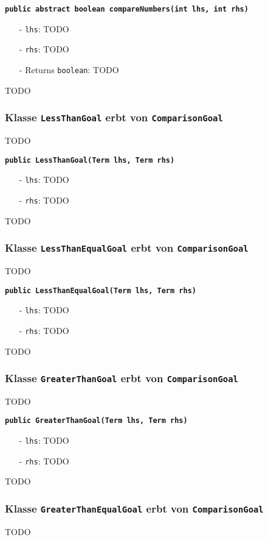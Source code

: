 \documentclass[parskip=full,11pt,twoside]{scrartcl}
\begin{document}
\textbf{\texttt{public abstract boolean compareNumbers(int lhs, int rhs)}}
\begin{itemize}[noitemsep]
	\item[-] \texttt{lhs}: TODO
	\item[-] \texttt{rhs}: TODO
	\item[-] Returns \texttt{boolean}: TODO
\end{itemize}
TODO

\subsubsection{Klasse \texttt{LessThanGoal} erbt von \texttt{ComparisonGoal}}
TODO

\textbf{\texttt{public LessThanGoal(Term lhs, Term rhs)}}
\begin{itemize}[noitemsep]
	\item[-] \texttt{lhs}: TODO
	\item[-] \texttt{rhs}: TODO
\end{itemize}
TODO

\subsubsection{Klasse \texttt{LessThanEqualGoal} erbt von \texttt{ComparisonGoal}}
TODO

\textbf{\texttt{public LessThanEqualGoal(Term lhs, Term rhs)}}
\begin{itemize}[noitemsep]
	\item[-] \texttt{lhs}: TODO
	\item[-] \texttt{rhs}: TODO
\end{itemize}
TODO

\subsubsection{Klasse \texttt{GreaterThanGoal} erbt von \texttt{ComparisonGoal}}
TODO

\textbf{\texttt{public GreaterThanGoal(Term lhs, Term rhs)}}
\begin{itemize}[noitemsep]
	\item[-] \texttt{lhs}: TODO
	\item[-] \texttt{rhs}: TODO
\end{itemize}
TODO

\subsubsection{Klasse \texttt{GreaterThanEqualGoal} erbt von \texttt{ComparisonGoal}}
TODO
\end{document}
